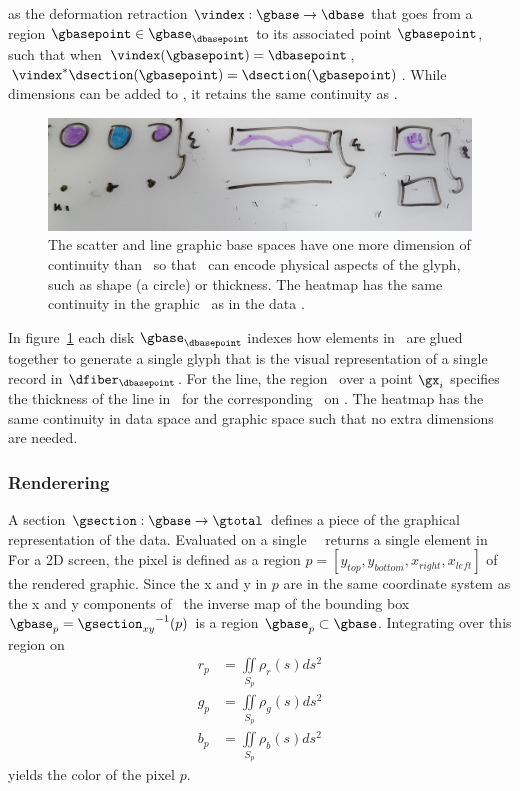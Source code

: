 \documentclass[../main.tex]{subfiles}
\begin{document}
 as the deformation retraction \cite{RetractionTopology2020} $\vindex: \gbase \rightarrow \dbase$ that goes from a region $\gbasepoint \in \gbase_{\dbasepoint}$ to its associated point $\gbasepoint$, such that when $\vindex(\gbasepoint) = \dbasepoint$,\, $\vindex^*\dsection(\gbasepoint) = \dsection(\gbasepoint)$. While dimensions can be added to \gbase, it retains the same continuity as \dbase.
 
\begin{figure}
    \includegraphics[width=1\textwidth]{figures/math/retraction_maps.png}
    \caption{The scatter and line graphic base spaces have one more dimension of continuity than \dbase\ so that \gbase\ can encode physical aspects of the glyph, such as shape (a circle) or thickness. The heatmap has the same continuity in the graphic \gbase\ as in the data \dbase. }
    \label{fig:graphic_retraction_map}
\end{figure}

In figure~\ref{fig:graphic_retraction_map} each disk $\gbase_{\dbasepoint}$ indexes how elements in \gfiber\ are glued together to generate a single glyph that is the visual representation of a single record in $\dfiber_{\dbasepoint}$. For the line, the region \gy\ over a point $\gx_i$ specifies the thickness of the line in \gbase\ for the corresponding \dsection\ on \dbase. The heatmap has the same continuity in data space and graphic space such that no extra dimensions are needed. 

 
\subsubsection{Renderering \gsection}
\label{sec:graphic_section}
A section $\gsection: \gbase\rightarrow \gtotal$ defines a piece of the graphical representation of the data. Evaluated on a single \gbasepoint\, \gsection\ returns a single element in \gfiber\. For a 2D screen, the pixel is defined as a region $p=\left[y_{top}, y_{bottom}, x_{right}, x_{left}\right]$ of the rendered graphic. Since the x and y in $p$ are in the same coordinate system as the x and y components of \gfiber\,  the inverse map of the bounding box $\gbase_{p} ={\gsection_{xy}}^{-1}(p)$ is a region $\gbase_p \subset \gbase$. Integrating over this region on \gbase\
\begin{align}
    r_p &= \iint\limits_{S_p} \rho_r(s)ds^{2}\\
    g_p &= \iint\limits_{S_p} \rho_g(s)ds^{2}\\
    b_p &= \iint\limits_{S_p} \rho_b(s)ds^{2}
\end{align}
yields the color of the pixel $p$.
\end{document}
